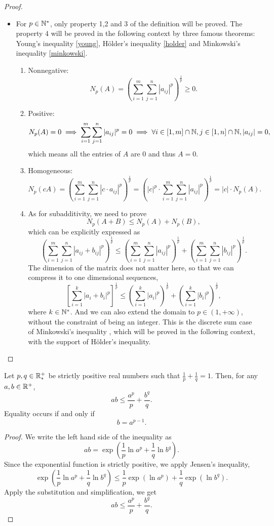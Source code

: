 \begin{proof}
\begin{itemize}
	\item For \(p\in\mathbb{N}^*\), only property 1,2 and 3 of the definition will be proved.
	The property 4 will be proved in the following context by three famous theorems: Young's inequality \ref{young}, H\"{o}lder's inequality \ref{holder} and Minkowski's inequality \ref{minkowski}.
	\begin{enumerate}
		\item Nonnegative:
		\[ N_p(A)=\left(\sum_{i=1}^m\sum_{j=1}^n|a_{ij}|^p\right)^{\frac{1}{p}}\ge0. \]
		\item Positive:
		\[N_p(A)=0\implies\sum_{i=1}^m\sum_{j=1}^n|a_{ij}|^p=0\implies \forall i\in[1,m]\cap\mathbb{N},j\in[1,n]\cap\mathbb{N},|a_{ij}|=0, \]
		which means all the entries of $A$ are 0 and thus \(A=0\).
		\item Homogeneous:
		\[ N_p(cA)=\left(\sum_{i=1}^m\sum_{j=1}^n|c\cdot a_{ij}|^p\right)^{\frac{1}{p}}=\left(|c|^p\cdot\sum_{i=1}^m\sum_{j=1}^n|a_{ij}|^p\right)^{\frac{1}{p}}=|c|\cdot N_p(A). \]
		\item As for subadditivity, we need to prove
		\[ N_p(A+B)\leq N_p(A)+N_p(B), \]
		which can be explicitly expressed as
		\[ \left(\sum_{i=1}^m\sum_{j=1}^n|a_{ij}+b_{ij}|^p\right)^{\frac{1}{p}}\leq\left(\sum_{i=1}^m\sum_{j=1}^n|a_{ij}|^p\right)^{\frac{1}{p}}+\left(\sum_{i=1}^m\sum_{j=1}^n|b_{ij}|^p\right)^{\frac{1}{p}}. \]
		The dimension of the matrix does not matter here, so that we can compress it to one dimensional sequences,
		\begin{equation}\label{minkowskii}
		\left[\sum_{i=1}^k|a_i+b_i|^p\right]^\frac{1}{p}\leq\left(\sum_{i=1}^k |a_i|^p\right)^\frac{1}{p}+\left(\sum_{i=1}^k |b_i|^p\right)^\frac{1}{p},
		\end{equation}
		where \(k\in\mathbb{N}^*\).
		And we can also extend the domain to \(p\in(1,+\infty)\), without the constraint of being an integer.
		This is the discrete sum case of Minkowski's inequality , which will be proved in the following context, with the support of H\"{o}lder's inequality.
	\end{enumerate}
\end{itemize}
\end{proof}



\begin{theorem}\label{young}
Let \(p,q\in\mathbb{R}_*^+\) be strictly positive real numbers such that \(\frac{1}{p}+\frac{1}{q}=1\).
Then, for any \(a,b\in\mathbb{R}^+\),
\begin{equation}
ab\leq\frac{a^p}{p}+\frac{b^q}{q}.
\end{equation}
Equality occurs if and only if
\[ b=a^{p-1}. \]
\end{theorem}
\begin{proof}
We write the left hand side of the inequality as
\[ ab=\exp\left(\frac{1}{p}\ln a^p+\frac{1}{q}\ln b^q\right). \]
Since the exponential function is strictly positive, we apply Jensen's inequality,
\[ \exp\left(\frac{1}{p}\ln a^p+\frac{1}{q}\ln b^q\right)\leq\frac{1}{p}\exp\left(\ln a^p\right)+\frac{1}{q}\exp\left(\ln b^q\right). \]
Apply the substitution and simplification, we get
\[ ab\leq\frac{a^p}{p}+\frac{b^q}{q}. \]
\end{proof}


